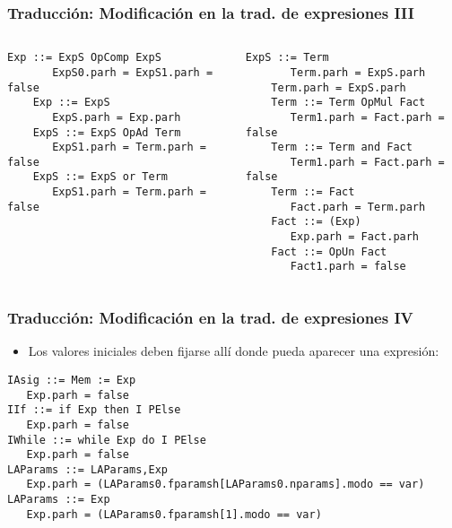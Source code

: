 \documentclass[hyperref={pdfpagelabels=false},tree-dvips,compress]{beamer}
\begin{document}
\begin{frame}[fragile]
\frametitle{Traducción: Modificación en la trad. de expresiones III}

\begin{columns}[T]
	\begin{lstlisting}[style=gramaticas,basicstyle=\footnotesize\ttfamily]
	Exp ::= ExpS OpComp ExpS
	   ExpS0.parh = ExpS1.parh = false
	Exp ::= ExpS
	   ExpS.parh = Exp.parh
	ExpS ::= ExpS OpAd Term
	   ExpS1.parh = Term.parh = false
	ExpS ::= ExpS or Term
	   ExpS1.parh = Term.parh = false
	\end{lstlisting}
	\begin{lstlisting}[style=gramaticas,basicstyle=\footnotesize\ttfamily]
	ExpS ::= Term
	   Term.parh = ExpS.parh
	Term.parh = ExpS.parh
	Term ::= Term OpMul Fact
	   Term1.parh = Fact.parh = false
	Term ::= Term and Fact
	   Term1.parh = Fact.parh = false
	Term ::= Fact
	   Fact.parh = Term.parh
	Fact ::= (Exp)
	   Exp.parh	= Fact.parh
	Fact ::= OpUn Fact
	   Fact1.parh = false
	\end{lstlisting}
\end{columns}

\end{frame}
\begin{frame}[fragile]
\frametitle{Traducción: Modificación en la trad. de expresiones IV}

\begin{itemize}
	\item Los valores iniciales deben fijarse allí donde pueda aparecer una expresión:
\end{itemize}

\begin{lstlisting}[style=gramaticas,basicstyle=\footnotesize\ttfamily]
IAsig ::= Mem := Exp
   Exp.parh = false
IIf ::= if Exp then I PElse
   Exp.parh = false
IWhile ::= while Exp do I PElse
   Exp.parh = false
LAParams ::= LAParams,Exp
   Exp.parh = (LAParams0.fparamsh[LAParams0.nparams].modo == var)
LAParams ::= Exp
   Exp.parh = (LAParams0.fparamsh[1].modo == var)
\end{lstlisting}

\end{frame}
\end{document}
